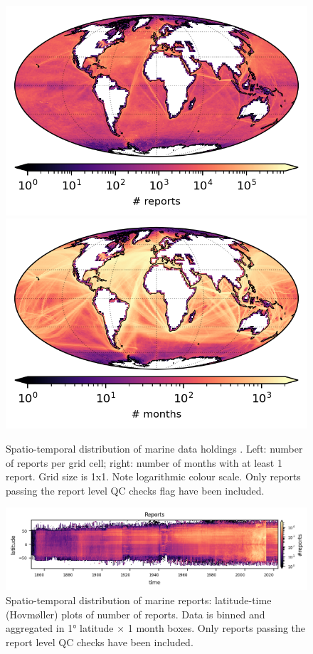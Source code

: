 \begin{figure} [h]
    \centering
    \includegraphics{resources/header-reports-map-optimal.png}
    \includegraphics{resources/header-months-map-optimal.png}
    \caption{Spatio-temporal distribution of marine data holdings \datatimerange{}. Left: number of reports per grid cell; right: number of months with at least 1 report. Grid size is 1x1. Note logarithmic colour scale. Only reports passing the report level QC checks flag have been included.\\}
    \label{fig:nreports-map}
\end{figure}

\begin{figure}
    \centering
    \includegraphics{resources/header-nreports_hovmoller_monthly}
    \caption{Spatio-temporal distribution of marine reports: latitude-time (Hovmøller) plots of number of reports. Data is binned and aggregated in 1° latitude × 1 month boxes. Only reports passing the report level QC checks have been included.\\}
    \label{fig:nreports-hovmoller}
\end{figure}

